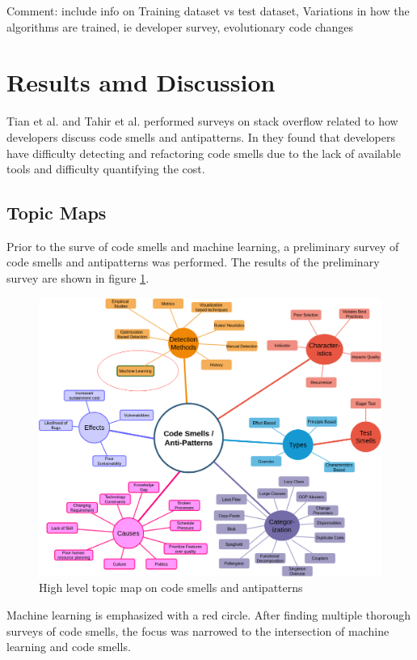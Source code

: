\documentclass[conference]{IEEEtran}
\begin{document}
Comment: include info on Training dataset vs test dataset, Variations in how the algorithms are trained, ie developer survey, evolutionary code changes

\section{Results amd Discussion}
Tian et al.\cite{tian_how_2019} and Tahir et al.\cite{tahir_can_2018} performed surveys on stack overflow related to how developers discuss code smells and antipatterns. In \cite{tian_how_2019} they found that developers have difficulty detecting and refactoring code smells due to the lack of available tools and difficulty quantifying the cost.

\subsection{Topic Maps}

Prior to the surve of code smells and machine learning, a preliminary survey of code smells and antipatterns was performed. The results of the preliminary survey are shown in figure \ref{fig:TM}.

\begin{figure}[ht]
  \centerline{\includegraphics[width=\linewidth]{AntiPattern-TopicMap11-23.png}}
  \caption{High level topic map on code smells and antipatterns}
  \label{fig:TM}
\end{figure} 

Machine learning is emphasized with a red circle. 
After finding multiple thorough surveys of code smells, the focus was narrowed to the intersection of machine learning and code smells.
\end{document}
